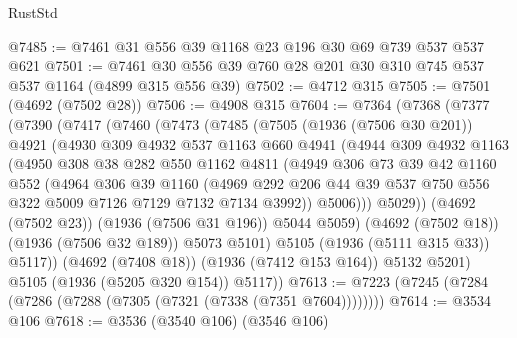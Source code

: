\begin{lexlean}{RustStd}
\begin{coremodule}
@7485 := @7461 @31 @556 @39 @1168 @23 @196 @30 @69 @739 @537 @537 @621
@7501 := @7461 @30 @556 @39 @760 @28 @201 @30 @310 @745 @537 @537 @1164 (@4899 @315 @556 @39)
@7502 := @4712 @315
@7505 := @7501 (@4692 (@7502 @28))
@7506 := @4908 @315
@7604 := @7364
    (@7368
      (@7377
        (@7390
          (@7417
            (@7460
              (@7473
                (@7485
                  (@7505
                    (@1936 (@7506 @30 @201))
                    @4921
                    (@4930
                      @309
                      @4932
                      @537
                      @1163
                      @660
                      @4941
                      (@4944
                        @309
                        @4932
                        @1163
                        (@4950
                          @308
                          @38
                          @282
                          @550
                          @1162
                          @4811
                          (@4949
                            @306
                            @73
                            @39
                            @42
                            @1160
                            @552
                            (@4964
                              @306
                              @39
                              @1160
                              (@4969
                                @292
                                @206
                                @44
                                @39
                                @537
                                @750
                                @556
                                @322
                                @5009
                                @7126
                                @7129
                                @7132
                                @7134
                                @3992))
                            @5006)))
                      @5029))
                  (@4692 (@7502 @23))
                  (@1936 (@7506 @31 @196))
                  @5044
                  @5059)
                (@4692 (@7502 @18))
                (@1936 (@7506 @32 @189))
                @5073
                @5101)
              @5105
              (@1936 (@5111 @315 @33))
              @5117))
          (@4692 (@7408 @18))
          (@1936 (@7412 @153 @164))
          @5132
          @5201)
        @5105
        (@1936 (@5205 @320 @154))
        @5117))
@7613 := @7223 (@7245 (@7284 (@7286 (@7288 (@7305 (@7321 (@7338 (@7351 @7604))))))))
@7614 := @3534 @106
@7618 := @3536 (@3540 @106) (@3546 @106)

\end{coremodule}
\end{lexlean}
